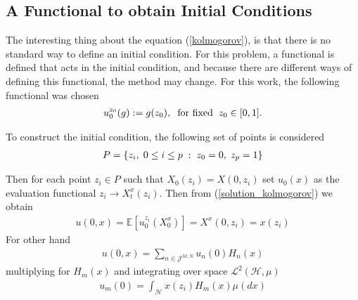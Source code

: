 \subsection{A Functional to obtain Initial Conditions}
	The interesting thing about the equation (\ref{kolmogorov}), is that there is no standard way to define an initial condition. For this problem, a functional is defined that acts in the initial condition, and because there are different ways of defining this functional, the method may change. For this work, the following functional was chosen 
	\begin{align*}
		u^{z_0}_0 (g) := g(z_0), \hspace{2mm} \text{for fixed} \hspace{2mm} z_0 \in [0, 1].
	\end{align*}
	
	To construct the initial condition, the following set of points is considered 
	\begin{align*}
		P = \{ z_i, \hspace{1mm} 0 \leq i \leq p \hspace{1mm} : \hspace{1mm} z_0 = 0, \hspace{1mm} z_p = 1 \}
	\end{align*}
	
	\noindent Then for each point $z_i \in P$ such that $X_0 (z_i) = X(0, z_i)$ set $u_0 (x)$ as the evaluation functional $z_i \longrightarrow X^x_t (z_i)$. Then from (\ref{solution_kolmogorov}) we obtain
	\begin{align}
		u(0, x) = \mathbb{E}[u^{z_i}_0 (X^x_0)] = X^x (0, z_i) = x(z_i)
	\end{align}
	For other hand
	\begin{align*}
		u (0, x) = \displaystyle \sum _{n \in \mathcal{J}^{M, N}} u_{n}(0) H_n (x)
	\end{align*}
	multiplying for $H_m (x)$ and integrating over space $\mathcal{L}^2 (\mathcal{H}, \mu)$ 
	\begin{align*}
		u_m (0) = \displaystyle \int_{\mathcal{H}} x(z_i) H_m (x) \mu (dx)
	\end{align*}
	
